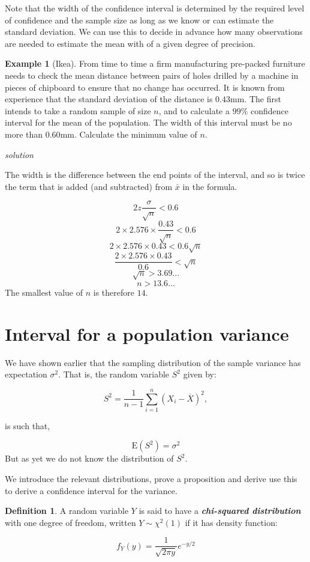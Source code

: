 \documentclass[
]{book}
\theoremstyle{definition}
\newtheorem{definition}{Definition}[chapter]
\theoremstyle{definition}
\newtheorem{example}{Example}[chapter]
\theoremstyle{definition}
\theoremstyle{definition}
\theoremstyle{remark}
\begin{document}
Note that the width of the confidence interval is determined by the required level of confidence and the sample size as long as we know or can estimate the standard deviation. We can use this to decide in advance how many observations are needed to estimate the mean with of a given degree of precision.

\begin{example}[Ikea]
From time to time a firm manufacturing pre-packed furniture needs to check the mean distance between pairs of holes drilled by a machine in pieces of chipboard to ensure that no change has occurred. It is known from experience that the standard deviation of the distance is \(0.43\)mm. The first intends to take a random sample of size \(n\), and to calculate a \(99\%\) confidence interval for the mean of the population. The width of this interval must be no more than \(0.60\)mm. Calculate the minimum value of \(n\).
\end{example}

\emph{solution}

The width is the difference between the end points of the interval, and so is twice the term that is added (and subtracted) from \(\bar{x}\) in the formula.

\[2z\frac{\sigma}{\sqrt{n}} <0.6\]
\[2\times 2.576\times \frac{0.43}{\sqrt{n}}<0.6\]
\[2\times 2.576\times {0.43}<0.6\sqrt{n}\]
\[\frac{2\times 2.576\times {0.43}}{0.6}<\sqrt{n}\]
\[\sqrt{n} > 3.69\ldots \]
\[n > 13.6\ldots \]
The smallest value of \(n\) is therefore \(14\).

\hypertarget{interval-for-a-population-variance}{%
\section{Interval for a population variance}\label{interval-for-a-population-variance}}

We have shown earlier that the sampling distribution of the sample variance has expectation \(\sigma^2\). That is, the random variable \(S^2\) given by:

\[S^2 = \frac{1}{n-1}\sum_{i=1}^n(X_i-\overline{X})^2 ,\]

is such that,

\[\text{E}(S^2) = \sigma^2\]
But as yet we do not know the distribution of \(S^2\).

We introduce the relevant distributions, prove a proposition and derive use this to derive a confidence interval for the variance.

\begin{definition}
A random variable \(Y\) is said to have a \textbf{\emph{chi-squared distribution}} with one degree of freedom, written \(Y\sim\chi^2(1)\) if it has density function:

\[f_Y(y) = \frac{1}{\sqrt{2\pi y}}e^{-y/2} \]
\end{definition}
\end{document}
